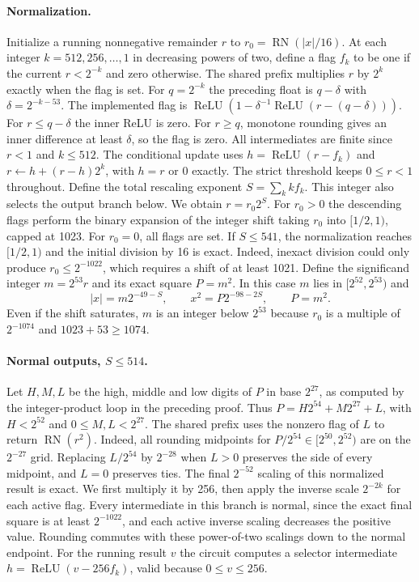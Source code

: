 \paragraph{Normalization.}
Initialize a running nonnegative remainder $r$ to $r_0=\operatorname{RN}(|x|/16)$. At each integer $k=512,256,\ldots,1$ in decreasing powers of two, define a flag $f_k$ to be one if the current $r<2^{-k}$ and zero otherwise. The shared prefix multiplies $r$ by $2^k$ exactly when the flag is set.
For $q=2^{-k}$ the preceding float is $q-\delta$ with $\delta=2^{-k-53}$. The implemented flag is
$\operatorname{ReLU}(1-\delta^{-1}\operatorname{ReLU}(r-(q-\delta)))$.
For $r\le q-\delta$ the inner ReLU is zero. For $r\ge q$, monotone rounding gives an inner difference at least $\delta$, so the flag is zero. All intermediates are finite since $r<1$ and $k\le512$.
The conditional update uses $h=\operatorname{ReLU}(r-f_k)$ and $r\gets h+(r-h)2^k$, with $h=r$ or $0$ exactly.
The strict threshold keeps $0\le r<1$ throughout.
Define the total rescaling exponent $S=\sum_k k f_k$. This integer also selects the output branch below. We obtain $r=r_0 2^S$.
For $r_0>0$ the descending flags perform the binary expansion of the integer shift taking $r_0$ into $[1/2,1)$, capped at 1023. For $r_0=0$, all flags are set.
If $S\le541$, the normalization reaches $[1/2,1)$ and the initial division by 16 is exact. Indeed, inexact division could only produce $r_0\le2^{-1022}$, which requires a shift of at least 1021.
Define the significand integer $m=2^{53}r$ and its exact square $P=m^2$. In this case $m$ lies in $[2^{52},2^{53})$ and
\[
 |x|=m2^{-49-S},\qquad x^2=P2^{-98-2S},\qquad P=m^2.
\]
Even if the shift saturates, $m$ is an integer below $2^{53}$ because $r_0$ is a multiple of $2^{-1074}$ and $1023+53\ge1074$.

\paragraph{Normal outputs, $S\le514$.}
Let $H,M,L$ be the high, middle and low digits of $P$ in base $2^{27}$, as computed by the integer-product loop in the preceding proof. Thus $P=H2^{54}+M2^{27}+L$, with $H<2^{52}$ and $0\le M,L<2^{27}$.
The shared prefix uses the nonzero flag of $L$ to return $\operatorname{RN}(r^2)$. Indeed, all rounding midpoints for $P/2^{54}\in[2^{50},2^{52})$ are on the $2^{-27}$ grid. Replacing $L/2^{54}$ by $2^{-28}$ when $L>0$ preserves the side of every midpoint, and $L=0$ preserves ties. The final $2^{-52}$ scaling of this normalized result is exact.
We first multiply it by 256, then apply the inverse scale $2^{-2k}$ for each active flag. Every intermediate in this branch is normal, since the exact final square is at least $2^{-1022}$, and each active inverse scaling decreases the positive value. Rounding commutes with these power-of-two scalings down to the normal endpoint. For the running result $v$ the circuit computes a selector intermediate $h=\operatorname{ReLU}(v-256f_k)$, valid because $0\le v\le256$.

